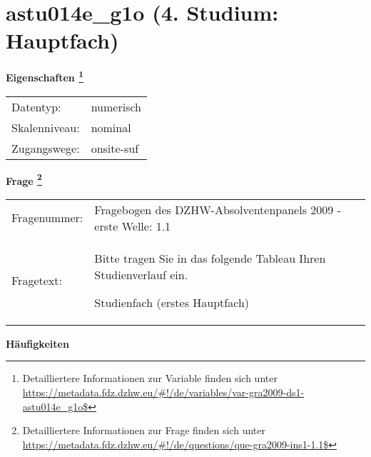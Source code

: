 
    \setcounter{footnote}{0}

    \vspace*{-1.8cm}
	\section{astu014e\_g1o (4. Studium: Hauptfach)}
	\label{section:astu014e_g1o}



    \vspace*{0.5cm}
    \noindent\textbf{Eigenschaften
	\footnote{Detailliertere Informationen zur Variable finden sich unter
		\url{https://metadata.fdz.dzhw.eu/\#!/de/variables/var-gra2009-ds1-astu014e_g1o$}}}\\
	\begin{tabularx}{\hsize}{@{}lX}
	Datentyp: & numerisch \\
	Skalenniveau: & nominal \\
	Zugangswege: &
	  onsite-suf
 \\
    \end{tabularx}



				\vspace*{0.5cm}
                \noindent\textbf{Frage
	                \footnote{Detailliertere Informationen zur Frage finden sich unter
		              \url{https://metadata.fdz.dzhw.eu/\#!/de/questions/que-gra2009-ins1-1.1$}}}\\
				\begin{tabularx}{\hsize}{@{}lX}
					Fragenummer: &
					  Fragebogen des DZHW-Absolventenpanels 2009 - erste Welle:
					  1.1
 \\
					Fragetext: & Bitte tragen Sie in das folgende Tableau Ihren Studienverlauf ein.\par  Studienfach (erstes Hauptfach) \\
				\end{tabularx}





        		\vspace*{0.5cm}
                \noindent\textbf{Häufigkeiten}

